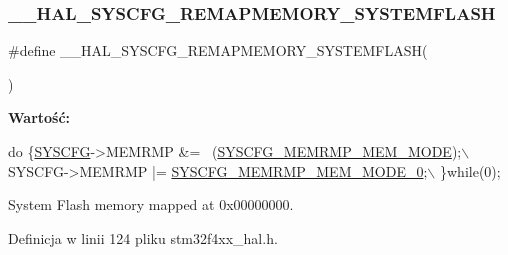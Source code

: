 \mbox{\label{group___h_a_l___exported___macros_ga59782d94690fd538b25def536c81c3ed}} 
\subsubsection{\texorpdfstring{\+\_\+\+\_\+\+H\+A\+L\+\_\+\+S\+Y\+S\+C\+F\+G\+\_\+\+R\+E\+M\+A\+P\+M\+E\+M\+O\+R\+Y\+\_\+\+S\+Y\+S\+T\+E\+M\+F\+L\+A\+SH}{\_\_HAL\_SYSCFG\_REMAPMEMORY\_SYSTEMFLASH}}
{\footnotesize\ttfamily \#define \+\_\+\+\_\+\+H\+A\+L\+\_\+\+S\+Y\+S\+C\+F\+G\+\_\+\+R\+E\+M\+A\+P\+M\+E\+M\+O\+R\+Y\+\_\+\+S\+Y\+S\+T\+E\+M\+F\+L\+A\+SH(\begin{DoxyParamCaption}{ }\end{DoxyParamCaption})}

{\bfseries Wartość\+:}
\begin{DoxyCode}
\textcolor{keywordflow}{do} \{\hyperlink{group___peripheral__declaration_ga3c833fe1c486cb62250ccbca32899cb8}{SYSCFG}->MEMRMP &= ~(\hyperlink{group___peripheral___registers___bits___definition_ga3c05039ec67573c00da29f58b914f258}{SYSCFG\_MEMRMP\_MEM\_MODE});\(\backslash\)
                                                         SYSCFG->MEMRMP |= 
      \hyperlink{group___peripheral___registers___bits___definition_ga30d5f406535f94faea2e7f924d50201b}{SYSCFG\_MEMRMP\_MEM\_MODE\_0};\(\backslash\)
                                                        \}\textcolor{keywordflow}{while}(0);
\end{DoxyCode}


System Flash memory mapped at 0x00000000. 



Definicja w linii 124 pliku stm32f4xx\+\_\+hal.\+h.


